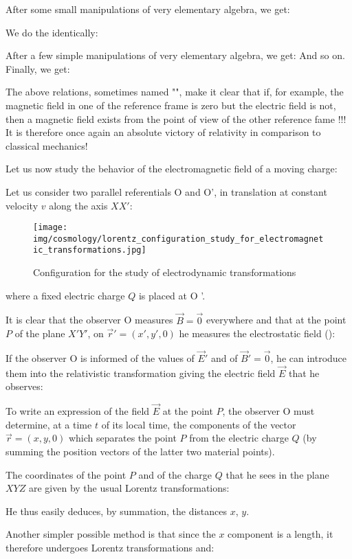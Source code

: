 	After some small manipulations of very elementary algebra, we get:
	
	We do the identically:
	
	After a few simple manipulations of very elementary algebra, we get:
	And so on. Finally, we get:
	
	The above relations, sometimes named "", make it clear that if, for example, the magnetic field in one of the reference frame is zero but the electric field is not, then a magnetic field exists from the point of view of the other reference fame !!! It is therefore once again an absolute victory of relativity in comparison to classical mechanics!

	Let us now study the behavior of the electromagnetic field of a moving charge:

	Let us consider two parallel referentials O and O', in translation at constant velocity $v$ along the axis $XX'$:
	\begin{figure}[H]
		\centering
		\texttt{[image: img/cosmology/lorentz\_configuration\_study\_for\_electromagnetic\_transformations.jpg]}
		\caption{Configuration for the study of electrodynamic transformations}
	\end{figure}
	where a fixed electric charge $Q$ is placed at O '.

	It is clear that the observer O measures $\vec{B}=\vec{0}$ everywhere and that at the point $P$ of the plane $X 'Y'$, on $\vec{r}'=(x',y',0)$ he measures the electrostatic field ():
	
	If the observer O is informed of the values of $\vec{E}'$ and of $\vec{B}'=\vec{0}$, he can introduce them into the relativistic transformation giving the electric field $\vec{E}$ that he observes:
	
	To write an expression of the field $\vec{E}$ at the point $P$, the observer O must determine, at a time $t$ of its local time, the components of the vector $\vec{r}=(x,y,0)$ which separates the point $P$ from the electric charge $Q$ (by summing the position vectors of the latter two material points).

	The coordinates of the point $P$ and of the charge $Q$ that he sees in the plane $XYZ$ are given by the usual Lorentz transformations:
	
	He thus easily deduces, by summation, the distances $x$, $y$.

	Another simpler possible method is that since the $x$ component is a length, it therefore undergoes Lorentz transformations and:
	
